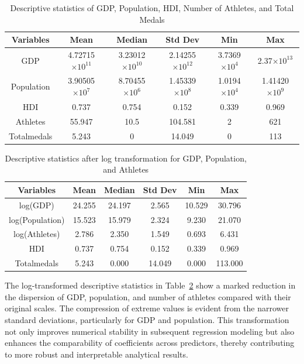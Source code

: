 \documentclass[11pt,twoside]{article}
\numberwithin{Theorem}{section}
\numberwithin{Definition}{section}
\numberwithin{Lemma}{section}
\numberwithin{Algorithm}{section}
\numberwithin{equation}{section}
\begin{document}
\begin{table}[htbp]
\centering
\caption{Descriptive statistics of GDP, Population, HDI, Number of Athletes, and Total Medals}
\label{tab:descriptive_statistics}
\begin{tabular}{cccccc}
\toprule
\textbf{Variables} & \textbf{Mean} & \textbf{Median} & \textbf{Std Dev} & \textbf{Min} & \textbf{Max} \\
\midrule
GDP & 4.72715$\times 10^{11}$ & 3.23012$\times 10^{10}$ & 2.14255$\times 10^{12}$ & 3.7369$\times 10^{4}$ & 2.37$\times 10^{13}$ \\
Population & 3.90505$\times 10^{7}$ & 8.70455$\times 10^{6}$ & 1.45339$\times 10^{8}$ & 1.0194$\times 10^{4}$ & 1.41420$\times 10^{9}$ \\
HDI & 0.737 & 0.754 & 0.152 & 0.339 & 0.969 \\
Athletes & 55.947 & 10.5 & 104.581 & 2 & 621 \\
Totalmedals & 5.243 & 0 & 14.049 & 0 & 113 \\
\bottomrule
\end{tabular}
\end{table}

\begin{table}[htbp]
\centering
\caption{Descriptive statistics after log transformation for GDP, Population, and Athletes}
\label{tab:descriptive_statistics_log}
\begin{tabular}{cccccc}
\toprule
\textbf{Variables} & \textbf{Mean} & \textbf{Median} & \textbf{Std Dev} & \textbf{Min} & \textbf{Max} \\
\midrule
log(GDP)         & 24.255 &  24.197 &    2.565 & 10.529 &  30.796 \\
log(Population)  & 15.523 &  15.979 &    2.324 &  9.230 &  21.070 \\
log(Athletes)    &  2.786 &   2.350 &    1.549 &  0.693 &   6.431 \\
HDI              &  0.737 &   0.754 &    0.152 &  0.339 &   0.969 \\
Totalmedals      &  5.243 &   0.000 &   14.049 &  0.000 & 113.000 \\
\bottomrule
\end{tabular}
\end{table}

The log-transformed descriptive statistics in Table~\ref{tab:descriptive_statistics_log} show a marked reduction in the dispersion of GDP, population, and number of athletes compared with their original scales. The compression of extreme values is evident from the narrower standard deviations, particularly for GDP and population. This transformation not only improves numerical stability in subsequent regression modeling but also enhances the comparability of coefficients across predictors, thereby contributing to more robust and interpretable analytical results.
\end{document}
